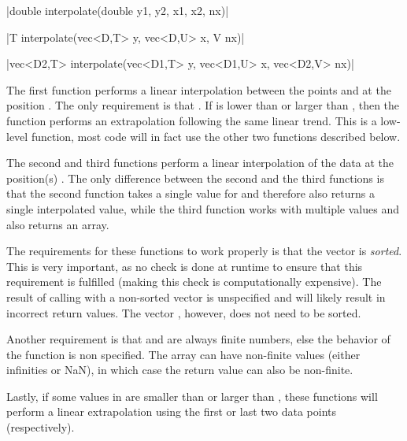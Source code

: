 \funcitem \cppinline|double interpolate(double y1, y2, x1, x2, nx)| 

\cppinline|T interpolate(vec<D,T> y, vec<D,U> x, V nx)|

\cppinline|vec<D2,T> interpolate(vec<D1,T> y, vec<D1,U> x, vec<D2,V> nx)|

The first  function performs a linear interpolation between the points  and  at the position . The only requirement is that . If  is lower than  or larger than , then the function performs an extrapolation following the same linear trend. This is a low-level function, most code will in fact use the other two functions described below.

The second and third  functions perform a linear interpolation of the data  at the position(s) . The only difference between the second and the third functions is that the second function takes a single value for  and therefore also returns a single interpolated value, while the third function works with multiple  values and also returns an array.

The requirements for these functions to work properly is that the vector  is \emph{sorted}. This is very important, as no check is done at runtime to ensure that this requirement is fulfilled (making this check is computationally expensive). The result of calling  with a non-sorted  vector is unspecified and will likely result in incorrect return values. The vector , however, does not need to be sorted.

Another requirement is that  and  are always finite numbers, else the behavior of the function is non specified. The  array can have non-finite values (either infinities or NaN), in which case the return value can also be non-finite.

Lastly, if some values in  are smaller than  or larger than , these functions will perform a linear extrapolation using the first or last two data points (respectively).

